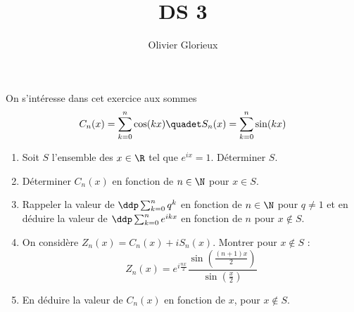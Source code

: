 \documentclass[a4paper, 11pt,reqno]{article}
\author{Olivier Glorieux}
\begin{document}
\title{ DS 3
}



\begin{exercice}
On s'intéresse dans cet exercice aux sommes 
$$C_n(x)= \sum_{k=0}^n \cos(kx)\quadet S_n(x)= \sum_{k=0}^n \sin(kx)$$
\begin{enumerate}
\item Soit $S$ l'ensemble des $x\in \R$ tel que $e^{ix}=1$. Déterminer $S$.
\item Déterminer $C_n(x)$ en fonction de $n\in \N$ pour $x\in S$. 

\item Rappeler la valeur de $\ddp \sum_{k=0}^n q^k $ en fonction  de  $n\in \N$ pour $q\neq 1$ et  en déduire la valeur de  $\ddp \sum_{k=0}^n e^{ikx} $  en fonction de $n$ pour $x\notin S$. 

\item On considère $Z_n(x)=C_n(x) +iS_n(x)$. Montrer pour $x\notin S$ :
$$Z_n(x) = e^{i\frac{nx}{2}} \frac{\sin\left(\frac{(n+1)x}{2}\right)}{\sin\left(\frac{x}{2}\right)}$$
\item En déduire la valeur de $C_n(x)$ en fonction de $x$, pour $x\notin S$. 
\end{enumerate}
\end{exercice}
\end{document}
